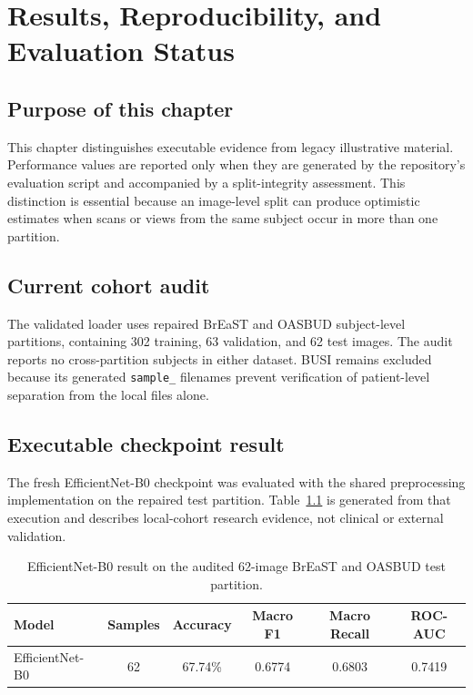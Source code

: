 \chapter{Results, Reproducibility, and Evaluation Status}
\label{ch:results}

\section{Purpose of this chapter}
This chapter distinguishes executable evidence from legacy illustrative material. Performance values are reported only when they are generated by the repository's evaluation script and accompanied by a split-integrity assessment. This distinction is essential because an image-level split can produce optimistic estimates when scans or views from the same subject occur in more than one partition.

\section{Current cohort audit}
The validated loader uses repaired BrEaST and OASBUD subject-level partitions, containing 302 training, 63 validation, and 62 test images. The audit reports no cross-partition subjects in either dataset. BUSI remains excluded because its generated \texttt{sample\_} filenames prevent verification of patient-level separation from the local files alone.

\section{Executable checkpoint result}
The fresh EfficientNet-B0 checkpoint was evaluated with the shared preprocessing implementation on the repaired test partition. Table~\ref{tab:provisional_result} is generated from that execution and describes local-cohort research evidence, not clinical or external validation.

\begin{table}[htbp]
\centering
\caption{EfficientNet-B0 result on the audited 62-image BrEaST and OASBUD test partition.}
\label{tab:provisional_result}
\begin{tabular}{@{}lccccc@{}}
\toprule
\textbf{Model} & \textbf{Samples} & \textbf{Accuracy} & \textbf{Macro F1} & \textbf{Macro Recall} & \textbf{ROC-AUC} \\ \midrule
EfficientNet-B0 & 62 & 67.74\% & 0.6774 & 0.6803 & 0.7419 \\ \bottomrule
\end{tabular}
\end{table}

